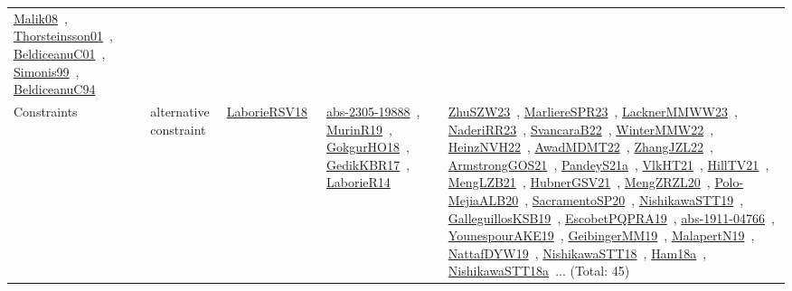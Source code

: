 {\begin{longtable}{lp{3cm}>{\raggedright\arraybackslash}p{6cm}>{\raggedright\arraybackslash}p{6cm}>{\raggedright\arraybackslash}p{8cm}}
\href{../works/Malik08.pdf}{Malik08}~\cite{Malik08}, \href{../works/Thorsteinsson01.pdf}{Thorsteinsson01}~\cite{Thorsteinsson01}, \href{../works/BeldiceanuC01.pdf}{BeldiceanuC01}~\cite{BeldiceanuC01}, \href{../works/Simonis99.pdf}{Simonis99}~\cite{Simonis99}, \href{../works/BeldiceanuC94.pdf}{BeldiceanuC94}~\cite{BeldiceanuC94}\\
Constraints & alternative constraint & \href{../works/LaborieRSV18.pdf}{LaborieRSV18}~\cite{LaborieRSV18} & \href{../works/abs-2305-19888.pdf}{abs-2305-19888}~\cite{abs-2305-19888}, \href{../works/MurinR19.pdf}{MurinR19}~\cite{MurinR19}, \href{../works/GokgurHO18.pdf}{GokgurHO18}~\cite{GokgurHO18}, \href{../works/GedikKBR17.pdf}{GedikKBR17}~\cite{GedikKBR17}, \href{../works/LaborieR14.pdf}{LaborieR14}~\cite{LaborieR14} & \href{../works/ZhuSZW23.pdf}{ZhuSZW23}~\cite{ZhuSZW23}, \href{../works/MarliereSPR23.pdf}{MarliereSPR23}~\cite{MarliereSPR23}, \href{../works/LacknerMMWW23.pdf}{LacknerMMWW23}~\cite{LacknerMMWW23}, \href{../works/NaderiRR23.pdf}{NaderiRR23}~\cite{NaderiRR23}, \href{../works/SvancaraB22.pdf}{SvancaraB22}~\cite{SvancaraB22}, \href{../works/WinterMMW22.pdf}{WinterMMW22}~\cite{WinterMMW22}, \href{../works/HeinzNVH22.pdf}{HeinzNVH22}~\cite{HeinzNVH22}, \href{../works/AwadMDMT22.pdf}{AwadMDMT22}~\cite{AwadMDMT22}, \href{../works/ZhangJZL22.pdf}{ZhangJZL22}~\cite{ZhangJZL22}, \href{../works/ArmstrongGOS21.pdf}{ArmstrongGOS21}~\cite{ArmstrongGOS21}, \href{../works/PandeyS21a.pdf}{PandeyS21a}~\cite{PandeyS21a}, \href{../works/VlkHT21.pdf}{VlkHT21}~\cite{VlkHT21}, \href{../works/HillTV21.pdf}{HillTV21}~\cite{HillTV21}, \href{../works/MengLZB21.pdf}{MengLZB21}~\cite{MengLZB21}, \href{../works/HubnerGSV21.pdf}{HubnerGSV21}~\cite{HubnerGSV21}, \href{../works/MengZRZL20.pdf}{MengZRZL20}~\cite{MengZRZL20}, \href{../works/Polo-MejiaALB20.pdf}{Polo-MejiaALB20}~\cite{Polo-MejiaALB20}, \href{../works/SacramentoSP20.pdf}{SacramentoSP20}~\cite{SacramentoSP20}, \href{../works/NishikawaSTT19.pdf}{NishikawaSTT19}~\cite{NishikawaSTT19}, \href{../works/GalleguillosKSB19.pdf}{GalleguillosKSB19}~\cite{GalleguillosKSB19}, \href{../works/EscobetPQPRA19.pdf}{EscobetPQPRA19}~\cite{EscobetPQPRA19}, \href{../works/abs-1911-04766.pdf}{abs-1911-04766}~\cite{abs-1911-04766}, \href{../works/YounespourAKE19.pdf}{YounespourAKE19}~\cite{YounespourAKE19}, \href{../works/GeibingerMM19.pdf}{GeibingerMM19}~\cite{GeibingerMM19}, \href{../works/MalapertN19.pdf}{MalapertN19}~\cite{MalapertN19}, \href{../works/NattafDYW19.pdf}{NattafDYW19}~\cite{NattafDYW19}, \href{../works/NishikawaSTT18.pdf}{NishikawaSTT18}~\cite{NishikawaSTT18}, \href{../works/Ham18a.pdf}{Ham18a}~\cite{Ham18a}, \href{../works/NishikawaSTT18a.pdf}{NishikawaSTT18a}~\cite{NishikawaSTT18a}... (Total: 45)\\

\end{longtable}}
